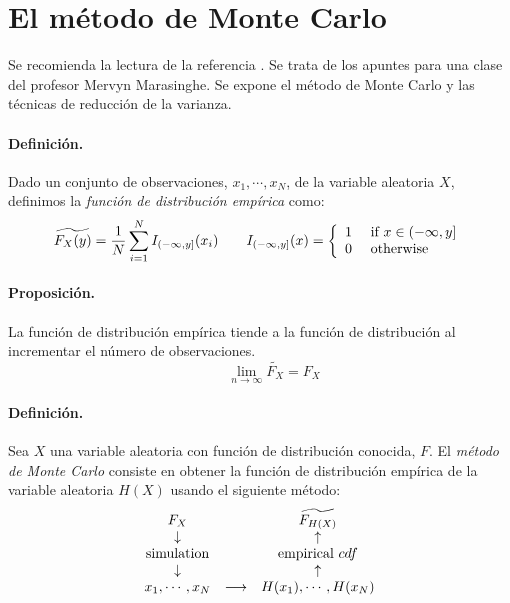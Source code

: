 
\section{El m\'etodo de Monte Carlo}

Se recomienda la lectura de la referencia \cite{mc:mervyn}. Se trata de los 
apuntes para una clase del profesor Mervyn Marasinghe. Se expone el m\'etodo 
de Monte Carlo y las t\'ecnicas de reducci\'on de la varianza.

\paragraph{Definici\'on.} Dado un conjunto de observaciones, $x_1, \cdots, x_N$,
de la variable aleatoria $X$, definimos la \emph{funci\'on de distribuci\'on emp\'irica}
 como:
\begin{displaymath}
\widetilde{F_X(y)} = \frac{1}{N} \sum_{i=1}^{N} I_{(-\infty,y]}(x_i) \qquad
I_{(-\infty,y]}(x) = \left\{
\begin{array}{ll}
1 & \textrm{ if } x \in (-\infty,y] \cr
0 & \textrm{ otherwise}
\end{array}
\right.
\end{displaymath}

\paragraph{Proposici\'on.} La funci\'on de distribuci\'on emp\'irica tiende a 
la funci\'on de distribuci\'on al incrementar el n\'umero de observaciones.
\begin{displaymath}
\qquad \lim_{n\to\infty} \widetilde{F_X} = F_X
\end{displaymath}

\paragraph{Definici\'on.} Sea $X$ una variable aleatoria con funci\'on de 
distribuci\'on conocida, $F$. El \emph{m\'etodo de Monte Carlo} consiste en obtener la funci\'on de distribuci\'on emp\'irica 
de la variable aleatoria $H(X)$ usando el siguiente m\'etodo:
\begin{displaymath}
\begin{array}{ccc}
F_X                 &     \quad       & \widetilde{F_{H(X)}}    \cr
\downarrow          &     \quad       & \uparrow                \cr
\textrm{simulation} &     \quad       & \textrm{empirical } cdf \cr
\downarrow          &     \quad       & \uparrow                \cr
x_1,\cdots,x_N      & \longrightarrow & H(x_1),\cdots,H(x_N)
\end{array}
\end{displaymath}

